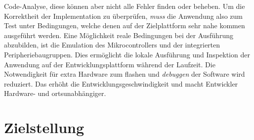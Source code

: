 Code-Analyse, diese können aber nicht alle Fehler finden oder beheben. 
Um die Korrektheit der Implementation zu überprüfen, \textit{muss} die
Anwendung also zum Test unter Bedingungen, welche denen auf der Zielplattform
sehr nahe kommen ausgeführt werden.\newline
Eine Möglichkeit reale Bedingungen bei der Ausführung abzubilden, ist die
Emulation des Mikrocontrollers und der integrierten Peripheriebaugruppen.
Dies ermöglicht die lokale Ausführung und Inspektion der Anwendung auf der
Entwicklungsplattform während der Laufzeit.
Die Notwendigkeit für extra Hardware zum flashen und \textit{debuggen} der
Software wird reduziert.
Das erhöht die Entwicklungsgeschwindigkeit und macht Entwickler Hardware- und
ortsunabhängiger.

\section{Zielstellung}

